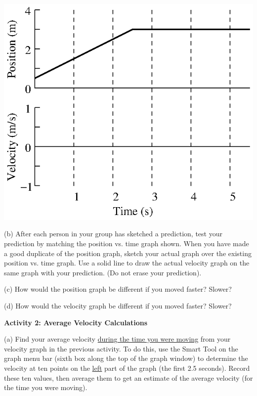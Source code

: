 \vspace{0.3cm}
{\par\centering \includegraphics{relating_fig1.eps} \par}
\vspace{0.3cm}

(b) After each person in your group has sketched a prediction, test your prediction
by matching the position vs. time graph shown. When you have made a good duplicate
of the position graph, sketch your actual graph over the existing position vs.
time graph.
Use a solid line to draw the actual velocity graph on the same graph with
your prediction. (Do not erase your prediction).

(c) How would the position graph be different if you moved faster? Slower? 
\vspace{20mm}

(d) How would the velocity graph be different if you moved faster? Slower? 
\vspace{20mm}

\textbf{Activity 2: Average Velocity Calculations} 

(a) Find your average velocity \underline{during the time you were moving} from your velocity graph in the previous activity. To do this, use the Smart Tool on the graph menu bar (sixth box along the top of the graph window) to determine the velocity at ten points on the \underline{left} part of the graph (the first 2.5 seconds). Record these ten values, then average them to get an estimate of the average velocity (for the time you were moving).

